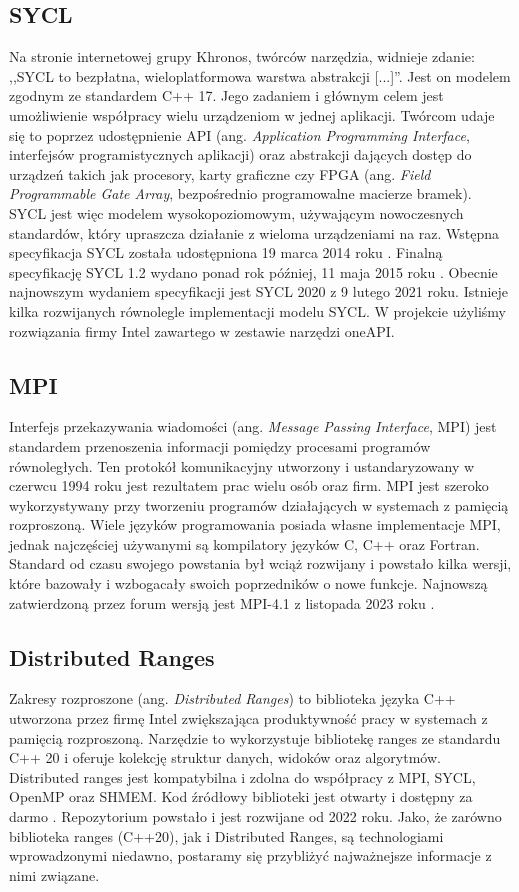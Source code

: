\documentclass[a4paper,12pt]{book} %
\begin{document}
\subsection{SYCL}
Na stronie internetowej grupy Khronos, twórców narzędzia, widnieje zdanie: ,,SYCL to bezpłatna, wieloplatformowa warstwa abstrakcji [...]''\cite{SYCL-overview}. Jest on modelem zgodnym ze standardem C++ 17. Jego zadaniem i głównym celem jest umożliwienie współpracy wielu urządzeniom w jednej aplikacji. Twórcom udaje się to poprzez udostępnienie API (ang. \emph{Application Programming Interface}, interfejsów programistycznych aplikacji) oraz abstrakcji dających dostęp do urządzeń takich jak procesory, karty graficzne czy FPGA (ang. \emph{Field Programmable Gate Array}, bezpośrednio programowalne macierze bramek). SYCL jest więc modelem wysokopoziomowym, używającym nowoczesnych standardów, który upraszcza działanie z wieloma urządzeniami na raz. Wstępna specyfikacja SYCL została udostępniona 19 marca 2014 roku \cite{SYCL1.2-provisional}. Finalną specyfikację SYCL 1.2 wydano ponad rok później, 11 maja 2015 roku \cite{SYCL1.2}. Obecnie najnowszym wydaniem specyfikacji jest SYCL 2020 z 9 lutego 2021 roku. Istnieje kilka rozwijanych równolegle implementacji modelu SYCL. W projekcie użyliśmy rozwiązania firmy Intel zawartego w zestawie narzędzi oneAPI.
\subsection{MPI}
Interfejs przekazywania wiadomości (ang. \emph{Message Passing Interface}, MPI) jest standardem przenoszenia informacji pomiędzy procesami programów równoległych. Ten protokół komunikacyjny utworzony i ustandaryzowany w czerwcu 1994 roku jest rezultatem prac wielu osób oraz firm. MPI jest szeroko wykorzystywany przy tworzeniu programów działających w systemach z pamięcią rozproszoną. Wiele języków programowania posiada własne implementacje MPI, jednak najczęściej używanymi są kompilatory języków C, C++ oraz Fortran. Standard od czasu swojego powstania był wciąż rozwijany i powstało kilka wersji, które bazowały i wzbogacały swoich poprzedników o nowe funkcje. Najnowszą zatwierdzoną przez forum wersją jest MPI-4.1 z listopada 2023 roku \cite{mpi41}.
\subsection{Distributed Ranges}
Zakresy rozproszone (ang. \emph{Distributed Ranges}) to biblioteka języka C++ utworzona przez firmę Intel zwiększająca produktywność pracy w systemach z pamięcią rozproszoną. Narzędzie to wykorzystuje bibliotekę ranges ze standardu C++ 20 i oferuje kolekcję struktur danych, widoków oraz algorytmów. Distributed ranges jest kompatybilna i zdolna do współpracy z MPI, SYCL, OpenMP oraz SHMEM. Kod źródłowy biblioteki jest otwarty i dostępny za darmo \cite{dist-ranges}. Repozytorium powstało i jest rozwijane od 2022 roku. Jako, że zarówno biblioteka ranges (C++20), jak i Distributed Ranges, są technologiami wprowadzonymi niedawno, postaramy się przybliżyć najważnejsze informacje z nimi związane.
\end{document}
